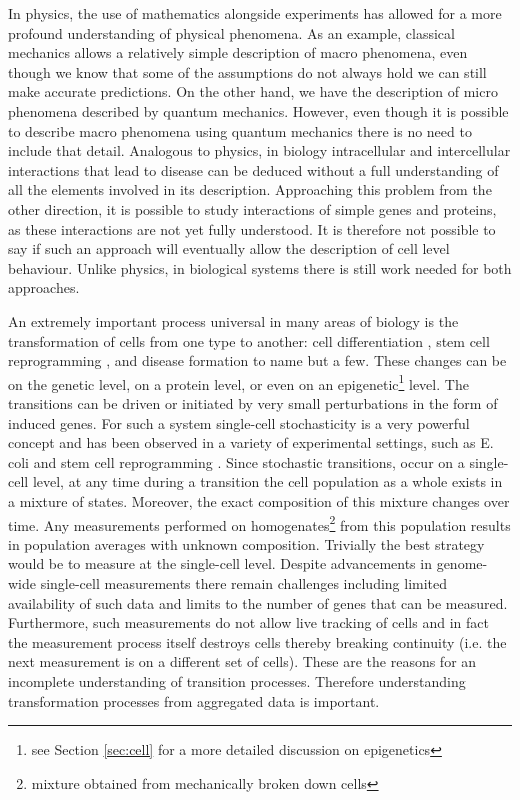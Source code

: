 In physics, the use of mathematics alongside experiments has allowed for a more profound understanding of physical phenomena. As an example, classical mechanics allows a relatively simple description of macro phenomena, even though we know that some of the assumptions do not always hold we can still make accurate predictions. On the other hand, we have the description of micro phenomena described by quantum mechanics. However, even though it is possible to describe macro phenomena using quantum mechanics there is no need to include that detail. %
Analogous to physics, in biology intracellular and intercellular interactions that lead to disease can be deduced without a full understanding of all the elements involved in its description. Approaching this problem from the other direction, it is possible to study interactions of simple genes and proteins, as these interactions are not yet fully understood. It is therefore not possible to say if such an approach will eventually allow the description of cell level behaviour. Unlike physics, in biological systems there is still work needed for both approaches.

An extremely important process universal in many areas of biology is the transformation of cells from one type to another: cell differentiation \citep{Tang:2010ed, Vierbuchen:2010fa}, stem cell reprogramming \citep{Takahashi:2006hi, Hanna:2010jy}, and disease formation \citep{Hannah:2000wo, Vogel:2010jb} to name but a few. These changes can be on the genetic level, on a protein level, or even on an epigenetic\footnote{see Section \ref{sec:cell} for a more detailed discussion on epigenetics} level. The transitions can be driven or initiated by very small perturbations in the form of induced genes. For such a system single-cell stochasticity is a very powerful concept and has been observed in a variety of experimental settings, such as E. coli  \citep{Elowitz:2002hb} and stem cell reprogramming \citep{Hanna:2009ix}. Since stochastic transitions, occur on a single-cell level, at any time during a transition the cell population as a whole exists in a mixture of states. Moreover, the exact composition of this mixture changes over time. Any measurements performed on homogenates\footnote{mixture obtained from mechanically broken down cells} from this population results in population averages with unknown composition. Trivially the best strategy would be to measure at the single-cell level. Despite advancements in genome-wide single-cell measurements \citep{deSouza:2012dz, Tang:2011gt} there remain challenges including limited availability of such data and limits to the number of genes that can be measured. Furthermore, such measurements do not allow live tracking of cells and in fact the measurement process itself destroys cells thereby breaking continuity (i.e. the next measurement is on a different set of cells). These are the reasons for an incomplete understanding of transition processes. Therefore understanding transformation processes from aggregated data is important.

